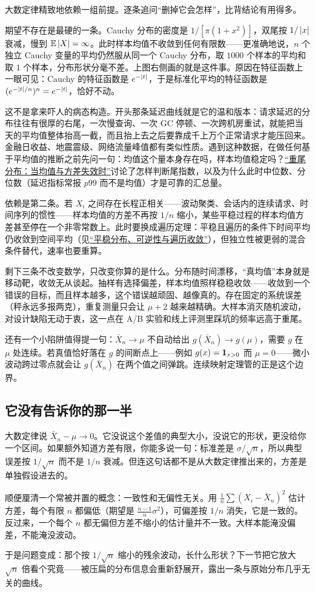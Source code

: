 大数定律精致地依赖一组前提。逐条追问``删掉它会怎样''，比背结论有用得多。

期望不存在是最硬的一条。Cauchy 分布的密度是 \(1/[\pi(1+x^2)]\)，双尾按 \(1/\left|x\right|\) 衰减，慢到 \(\mathbb{E}\left|X\right|=\infty\)。此时样本均值不收敛到任何有限数——更准确地说，\(n\) 个独立 Cauchy 变量的平均仍然服从同一个 Cauchy 分布，取 \(1000\) 个样本的平均和取 \(1\) 个样本，分布形状分毫不差。上图右侧画的就是这件事。原因在特征函数上一眼可见：Cauchy 的特征函数是 \(e^{-\left|t\right|}\)，于是标准化平均的特征函数是 \((e^{-\left|t\right|/n})^n=e^{-\left|t\right|}\)，恰好不动。

这不是拿来吓人的病态构造。开头那条延迟曲线就是它的温和版本：请求延迟的分布往往有很厚的右尾，一次慢查询、一次 GC 停顿、一次跨机房重试，就能把当天的平均值整体抬高一截，而且抬上去之后要靠成千上万个正常请求才能压回来。金融日收益、地震震级、网络流量峰值都有类似性质。遇到这种数据，在做任何基于平均值的推断之前先问一句：均值这个量本身存在吗，样本均值稳定吗？\hyperref[sec:05-Probability/06-Common-Distributions/07]{``重尾分布：当均值与方差失效时''}讨论了怎样判断尾指数，以及为什么此时中位数、分位数（延迟指标常报 \(p99\) 而不是均值）才是可靠的汇总量。

依赖是第二条。若 \(X_i\) 之间存在长程正相关——波动聚类、会话内的连续请求、时间序列的惯性——样本均值的方差不再按 \(1/n\) 缩小，某些平稳过程的样本均值方差甚至停在一个非零常数上。此时要换成遍历定理：平稳且遍历的条件下时间平均仍收敛到空间平均（见\hyperref[sec:06-Random-Processes/03-Markov-Chains/04]{``平稳分布、可逆性与遍历收敛''}），但独立性被更弱的混合条件替代，速率也要重算。

剩下三条不改变数学，只改变你算的是什么。分布随时间漂移，``真均值''本身就是移动靶，收敛无从谈起。抽样有选择偏差，样本均值照样稳稳收敛——收敛到一个错误的目标，而且样本越多，这个错误越顽固、越像真的。存在固定的系统误差（秤永远多报两克），重复测量只会让 \(\mu+2\) 越来越精确。大样本消灭随机波动，对设计缺陷无动于衷，这一点在 A/B 实验和线上评测里踩坑的频率远高于重尾。

还有一个小陷阱值得提一句：\(\bar X_n\to\mu\) 不自动给出 \(g(\bar X_n)\to g(\mu)\)，需要 \(g\) 在 \(\mu\) 处连续。若真值恰好落在 \(g\) 的间断点上——例如 \(g(x)=\mathbf{1}_{x>0}\) 而 \(\mu=0\)——微小波动跨过零点就会让 \(g(\bar X_n)\) 在两个值之间弹跳。连续映射定理管的正是这个边界。

\subsection{它没有告诉你的那一半}

大数定律说 \(\bar X_n-\mu\to0\)。它没说这个差值的典型大小，没说它的形状，更没给你一个区间。如果额外知道方差有限，你能多说一句：标准差是 \(\sigma/\sqrt n\)，所以典型误差按 \(1/\sqrt n\) 而不是 \(1/n\) 衰减。但连这句话都不是从大数定律推出来的，方差是单独假设进去的。

顺便厘清一个常被并置的概念：一致性和无偏性无关。用 \(\frac1n\sum(X_i-\bar X_n)^2\) 估计方差，每个有限 \(n\) 都偏低（期望是 \(\frac{n-1}{n}\sigma^2\)），可偏差按 \(1/n\) 消失，它是一致的。反过来，一个每个 \(n\) 都无偏但方差不缩小的估计量并不一致。大样本能淹没偏差，不能淹没波动。

于是问题变成：那个按 \(1/\sqrt n\) 缩小的残余波动，长什么形状？下一节把它放大 \(\sqrt n\) 倍看个究竟——被压扁的分布信息会重新舒展开，露出一条与原始分布几乎无关的曲线。
